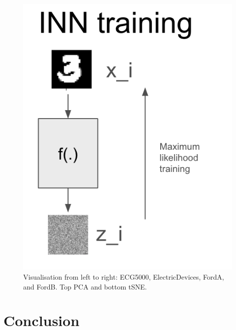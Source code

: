 \begin{figure}
    \vskip -0.2in 
    \centering
    \includegraphics[width=0.30\columnwidth]{fig_datasynth/inn_train.png}  
    \vspace{-2pt}
    \caption{\label{fig:exp_vrae_3} Visualisation from left to right: ECG5000, ElectricDevices, FordA, and FordB. Top PCA and bottom tSNE.}
    \vskip -0.0in 
\end{figure}
   
\section{Conclusion}
\label{sec:conclusion}
